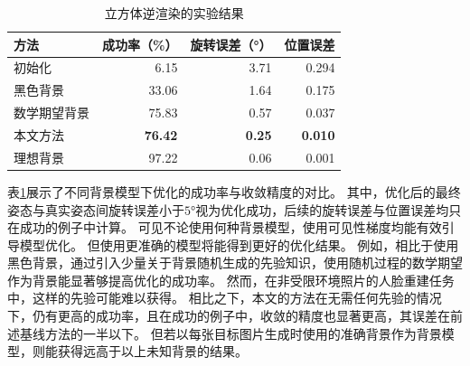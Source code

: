 \begin{table}
    \centering
    \caption{立方体逆渲染的实验结果}
    \label{tab:cube_opt}
    \begin{tabular}{l|rrr}
        \toprule
        方法       & 成功率（\%） & 旋转误差（°） & 位置误差 \\
        \midrule
        初始化      &  6.15 & 3.71 & 0.294 \\
        黑色背景    & 33.06 & 1.64 & 0.175 \\
        数学期望背景& 75.83 & 0.57 & 0.037 \\
        本文方法    & \textbf{76.42} & \textbf{0.25} & \textbf{0.010} \\
        \midrule
        理想背景    & 97.22 & 0.06 & 0.001 \\
        \bottomrule
    \end{tabular}
\end{table}
表\ref{tab:cube_opt}展示了不同背景模型下优化的成功率与收敛精度的对比。
其中，优化后的最终姿态与真实姿态间旋转误差小于$5°$视为优化成功，后续的旋转误差与位置误差均只在成功的例子中计算。
可见不论使用何种背景模型，使用可见性梯度均能有效引导模型优化。
但使用更准确的模型将能得到更好的优化结果。
例如，相比于使用黑色背景，通过引入少量关于背景随机生成的先验知识，使用随机过程的数学期望作为背景能显著够提高优化的成功率。
然而，在非受限环境照片的人脸重建任务中，这样的先验可能难以获得。
相比之下，本文的方法在无需任何先验的情况下，仍有更高的成功率，且在成功的例子中，收敛的精度也显著更高，其误差在前述基线方法的一半以下。
但若以每张目标图片生成时使用的准确背景作为背景模型，则能获得远高于以上未知背景的结果。


